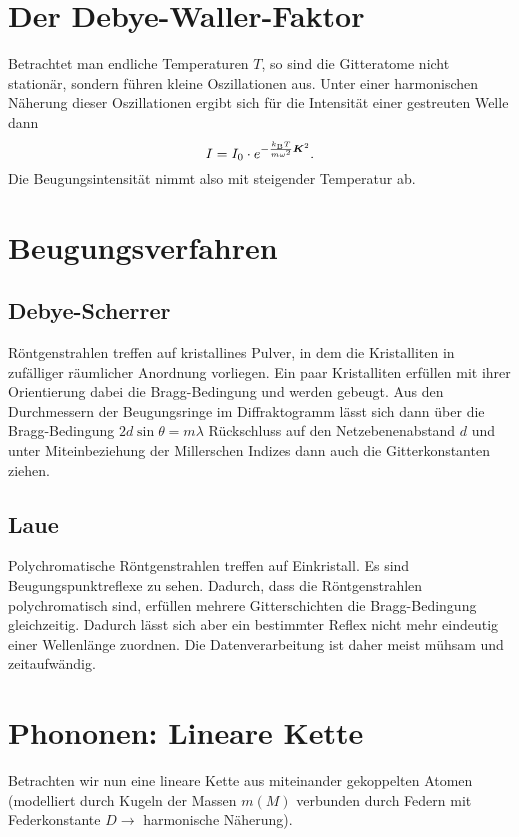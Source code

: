 \section{Der Debye-Waller-Faktor}
Betrachtet man endliche Temperaturen $T$, so sind die Gitteratome nicht stationär, sondern führen kleine Oszillationen aus.
Unter einer harmonischen Näherung dieser Oszillationen ergibt sich für die Intensität einer gestreuten Welle dann
\begin{equation*}
	I = I_0\cdot e^{-\frac{k_\text{B}T}{m\omega^2}\boldsymbol{K}^2}.
\end{equation*}
Die Beugungsintensität nimmt also mit steigender Temperatur ab.

\section{Beugungsverfahren}
\subsection{Debye-Scherrer}
Röntgenstrahlen treffen auf kristallines Pulver, in dem die Kristalliten in zufälliger räumlicher Anordnung vorliegen.
Ein paar Kristalliten erfüllen mit ihrer Orientierung dabei die Bragg-Bedingung und werden gebeugt.
Aus den Durchmessern der Beugungsringe im Diffraktogramm lässt sich dann über die Bragg-Bedingung $2d\sin\theta = m\lambda$ Rückschluss auf den Netzebenenabstand $d$ und unter Miteinbeziehung der Millerschen Indizes dann auch die Gitterkonstanten ziehen.

\subsection{Laue}
Polychromatische Röntgenstrahlen treffen auf Einkristall.
Es sind Beugungspunktreflexe zu sehen.
Dadurch, dass die Röntgenstrahlen polychromatisch sind, erfüllen mehrere Gitterschichten die Bragg-Bedingung gleichzeitig.
Dadurch lässt sich aber ein bestimmter Reflex nicht mehr eindeutig einer Wellenlänge zuordnen.
Die Datenverarbeitung ist daher meist mühsam und zeitaufwändig.

\section{Phononen: Lineare Kette}\label{sec:linear}
Betrachten wir nun eine lineare Kette aus miteinander gekoppelten Atomen (modelliert durch Kugeln der Massen $m(M)$ verbunden durch Federn mit Federkonstante $D\rightarrow$ harmonische Näherung).

